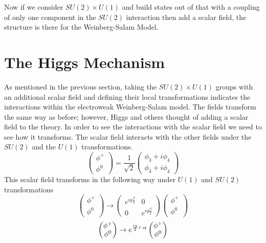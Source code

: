 Now if we consider $SU(2)\times U(1)$ and build states out of that with a coupling of only one component in the $SU(2)$ interaction then add a scalar field, the structure is there for the Weinberg-Salam Model. 

\section{The Higgs Mechanism}
As mentioned in the previous section, taking the $SU(2) \times U(1)$ groups with an additional scalar field and defining their local transformations indicates the interactions within the electroweak Weinberg-Salam model. The fields transform the same way as before; however, Higgs and others thought of adding a scalar field to the theory. In order to see the interactions with the scalar field we need to see how it transforms. 
The scalar field interacts with the other fields under the $SU(2)$ and the $U(1)$ transformations.  
\begin{equation}\begin{pmatrix}\phi^+ \\ \phi^0\end{pmatrix} = \frac{1}{\sqrt{2}}\begin{pmatrix} \phi_3 + i\phi_4 \\ \phi_3 + i\phi_4\end{pmatrix}  \end{equation}
This scalar field transforms in the following way under $U(1)$ and $SU(2)$ transformations 
\begin{equation}\begin{pmatrix}\phi^+ \\ \phi^0\end{pmatrix} \rightarrow \begin{pmatrix} e^{ig\frac{\beta}{2}} & 0 \\ 0 & e^{ig\frac{\beta}{2}}\end{pmatrix}\begin{pmatrix}\phi^+ \\ \phi^0\end{pmatrix}  \end{equation}
\begin{equation}\begin{pmatrix}\phi^+ \\ \phi^0\end{pmatrix} \rightarrow e^{\frac{ig}{2}\bold{\tau}\cdot\bold{\alpha}}    \begin{pmatrix}\phi^+ \\ \phi^0\end{pmatrix}  \end{equation}
